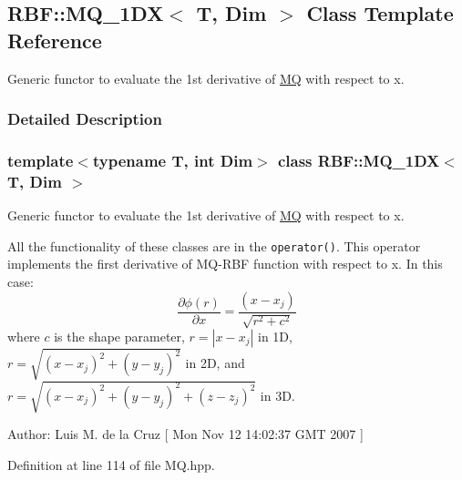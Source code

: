 \hypertarget{classRBF_1_1MQ__1DX}{
\subsection{RBF::MQ\_\-1DX$<$ T, Dim $>$ Class Template Reference}
\label{classRBF_1_1MQ__1DX}
}
Generic functor to evaluate the 1st derivative of \hyperlink{classRBF_1_1MQ}{MQ} with respect to x.  




\subsubsection{Detailed Description}
\subsubsection*{template$<$typename T, int Dim$>$ class RBF::MQ\_\-1DX$<$ T, Dim $>$}

Generic functor to evaluate the 1st derivative of \hyperlink{classRBF_1_1MQ}{MQ} with respect to x. 

All the functionality of these classes are in the {\tt operator()}. This operator implements the first derivative of MQ-RBF function with respect to x. In this case: \[ \frac{\partial \phi(r)}{\partial x} = \frac{(x-x_j)}{\sqrt{r^2+c^2}} \] where $ c $ is the shape parameter, $ r = |x - x_j| $ in 1D, $ r = \sqrt{(x - x_j)^2 + (y - y_j)^2} $ in 2D, and $ r = \sqrt{(x - x_j)^2 + (y - y_j)^2 + (z - z_j)^2} $ in 3D.

\begin{Desc}
\item[Author:]Luis M. de la Cruz \mbox{[} Mon Nov 12 14:02:37 GMT 2007 \mbox{]} \end{Desc}


Definition at line 114 of file MQ.hpp.